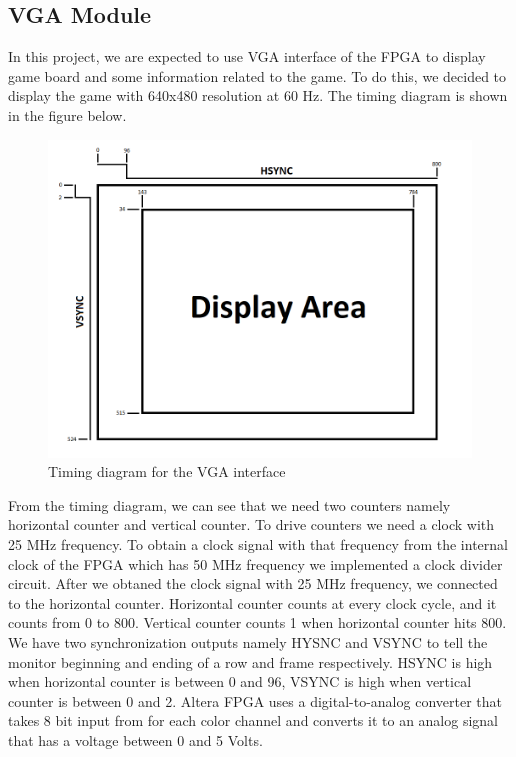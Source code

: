 \documentclass[conference]{IEEEtran}
\begin{document}
\subsection{VGA Module}
In this project, we are expected to use VGA interface of the FPGA to display game board and some information related to the game. 
To do this, we decided to display the game with 640x480 resolution at 60 Hz. \cite{vga} The timing diagram is shown in the figure below.
\begin{figure}[H]
  \centerline{\includegraphics[scale=0.4]{vga.png}}
   \caption{Timing diagram for the VGA interface}
   \label{Fig. 1.}
\end{figure} 
From the timing diagram, we can see that we need two counters namely horizontal counter and vertical counter.
To drive counters we need a clock with 25 MHz frequency. 
To obtain a clock signal with that frequency from the internal clock of the FPGA which has 50 MHz frequency we implemented a clock divider circuit. 
After we obtaned the clock signal with 25 MHz frequency, we connected to the horizontal counter. 
Horizontal counter counts at every clock cycle, and it counts from 0 to 800. Vertical counter counts 1 when horizontal counter hits 800. 
We have two synchronization outputs namely HYSNC and VSYNC to tell the monitor beginning and ending of a row and frame respectively. 
HSYNC is high when horizontal counter is between 0 and 96, VSYNC is high when vertical counter is between 0 and 2. 
Altera FPGA uses a digital-to-analog converter that takes 8 bit input from for each color channel and converts it to an analog signal that has a voltage between 
0 and 5 Volts. \cite{fpga} \\
\end{document}
